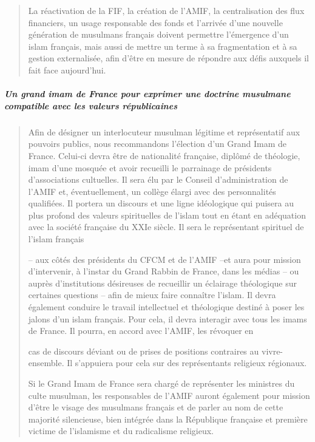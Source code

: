 \begin{quote}
La réactivation de la FIF, la création de l'AMIF, la centralisation des
flux financiers, un usage responsable des fonds et l'arrivée d'une
nouvelle génération de musulmans français doivent permettre l'émergence
d'un islam français, mais aussi de mettre un terme à sa fragmentation et
à sa gestion externalisée, afin d'être en mesure de répondre aux défis
auxquels il fait face aujourd'hui.
\end{quote}

\hypertarget{un-grand-imam-de-france-pour-exprimer-une-doctrine-musulmane-compatible-avec-les-valeurs-ruxe9publicaines}{%
\subparagraph{Un grand imam de France pour exprimer une doctrine
musulmane compatible avec les valeurs
républicaines}\label{un-grand-imam-de-france-pour-exprimer-une-doctrine-musulmane-compatible-avec-les-valeurs-ruxe9publicaines}}

\begin{quote}
Afin de désigner un interlocuteur musulman légitime et représentatif aux
pouvoirs publics, nous recommandons l'élection d'un Grand Imam de
France. Celui-ci devra être de nationalité française, diplômé de
théologie, imam d'une mosquée et avoir recueilli le parrainage de
présidents d'associations cultuelles. Il sera élu par le Conseil
d'administration de l'AMIF et, éventuellement, un collège élargi avec
des personnalités qualifiées. Il portera un discours et une ligne
idéologique qui puisera au plus profond des valeurs spirituelles de
l'islam tout en étant en adéquation avec la société française du XXIe
siècle. Il sera le représentant spirituel de l'islam français

-- aux côtés des présidents du CFCM et de l'AMIF --et aura pour mission
d'intervenir, à l'instar du Grand Rabbin de France, dans les médias --
ou auprès d'institutions désireuses de recueillir un éclairage
théologique sur certaines questions -- afin de mieux faire connaître
l'islam. Il devra également conduire le travail intellectuel et
théologique destiné à poser les jalons d'un islam français. Pour cela,
il devra interagir avec tous les imams de France. Il pourra, en accord
avec l'AMIF, les révoquer en



cas de discours déviant ou de prises de positions contraires au
vivre-ensemble. Il s'appuiera pour cela sur des représentants religieux
régionaux.

Si le Grand Imam de France sera chargé de représenter les ministres du
culte musulman, les responsables de l'AMIF auront également pour mission
d'être le visage des musulmans français et de parler au nom de cette
majorité silencieuse, bien intégrée dans la République française et
première victime de l'islamisme et du radicalisme religieux.
\end{quote}

